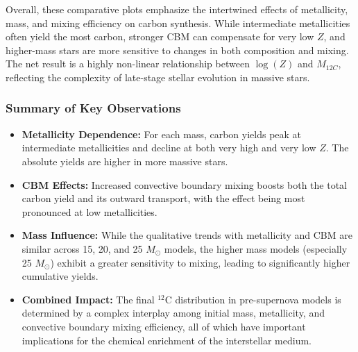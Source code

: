 Overall, these comparative plots emphasize the intertwined effects of metallicity, mass, and mixing efficiency on carbon synthesis. While intermediate metallicities often yield the most carbon, stronger CBM can compensate for very low $Z$, and higher-mass stars are more sensitive to changes in both composition and mixing. The net result is a highly non-linear relationship between $\log(Z)$ and $M_{12C}$, reflecting the complexity of late-stage stellar evolution in massive stars.

\subsubsection{Summary of Key Observations}
\begin{itemize}
    \item \textbf{Metallicity Dependence:} For each mass, carbon yields peak at intermediate metallicities and decline at both very high and very low $Z$. The absolute yields are higher in more massive stars.
    \item \textbf{CBM Effects:} Increased convective boundary mixing boosts both the total carbon yield and its outward transport, with the effect being most pronounced at low metallicities.
    \item \textbf{Mass Influence:} While the qualitative trends with metallicity and CBM are similar across 15, 20, and 25 $M_\odot$ models, the higher mass models (especially 25 $M_\odot$) exhibit a greater sensitivity to mixing, leading to significantly higher cumulative yields.
    \item \textbf{Combined Impact:} The final $^{12}$C distribution in pre-supernova models is determined by a complex interplay among initial mass, metallicity, and convective boundary mixing efficiency, all of which have important implications for the chemical enrichment of the interstellar medium.
\end{itemize}



